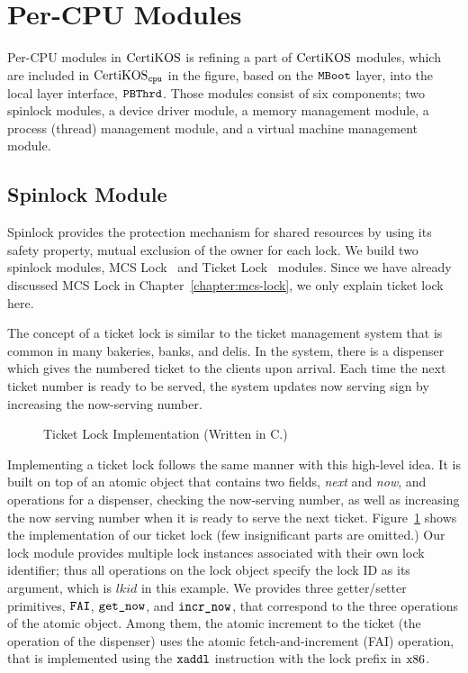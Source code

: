 \section{Per-CPU Modules}
\label{chapter:certikos:sec:per-cpu-modules}

Per-CPU modules in $\mathrm{CertiKOS}$ is refining a part of $\mathrm{CertiKOS}$ modules,
which are included in $\mathrm{CertiKOS}_{{\mathrm{\texttt{cpu}}}}$ in the figure, based on the ${\mathrm{\texttt{MBoot}}}$ layer, 
into the local layer interface, ${\mathrm{\texttt{PBThrd}}}$.
Those modules consist of six components;
two spinlock modules, a device driver module, a memory management module,  a process (thread) management module, and a virtual machine management module. 

\subsection{Spinlock Module}
\label{chapter:certikos:subsec:spinlock-module}

Spinlock provides the protection mechanism for shared resources by using its safety property, mutual exclusion of the owner for each lock. 
We build two spinlock modules, 
MCS Lock~\cite{mcs91} and Ticket Lock~\cite{lwn:ticketlocks} modules.
Since we have already discussed MCS Lock in Chapter~\ref{chapter:mcs-lock}, 
we only explain ticket lock here.

The concept of a ticket lock is similar to the ticket management system that is common in many bakeries, banks, and delis. 
In the system, 
there is a dispenser which gives the numbered ticket to the clients upon arrival. 
Each time the next ticket number is ready to 
be served, 
the system updates now serving sign by increasing the now-serving number. 
\begin{figure}
 
\caption{Ticket Lock Implementation (Written in C.)}
\label{fig:chapter:certikos:ticket-lock-example}
\end{figure}
Implementing a ticket lock follows the same manner with this high-level idea.
It is built on top of an atomic object that contains two fields, \textit{next} and \textit{now},
and operations for a dispenser, checking the now-serving number, as well as increasing the now serving number when
it is ready to serve the next ticket. 
Figure~\ref{fig:chapter:certikos:ticket-lock-example} shows the implementation of our ticket lock (few insignificant parts are omitted.)
Our lock module provides multiple lock instances associated with their own lock identifier;
thus all operations on the lock object specify the lock ID as its argument, which is $lkid$ in this example.
We provides three getter/setter primitives, ${\mathrm{\texttt{FAI}}}$, ${\mathrm{\texttt{get\_now}}}$, and ${\mathrm{\texttt{incr\_now}}}$,
that correspond to the three operations of the atomic object.
Among them, the atomic increment to the ticket (the operation of the dispenser) 
uses the atomic fetch-and-increment (FAI) operation, that is implemented using the ${\mathrm{\texttt{xaddl}}}$ instruction with the 
lock prefix in $\mathrm{x86}$.

